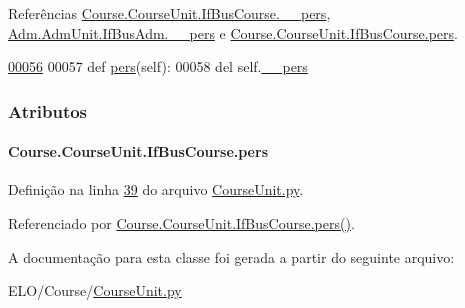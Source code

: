 Referências \hyperlink{CourseUnit_8py_source_l00051}{Course.\-Course\-Unit.\-If\-Bus\-Course.\-\_\-\-\_\-pers}, \hyperlink{AdmUnit_8py_source_l00112}{Adm.\-Adm\-Unit.\-If\-Bus\-Adm.\-\_\-\-\_\-pers} e \hyperlink{classCourse_1_1CourseUnit_1_1IfBusCourse_ab926ae8fb127b7697e2b63025df09a78}{Course.\-Course\-Unit.\-If\-Bus\-Course.\-pers}.


\begin{DoxyCode}
\hypertarget{classCourse_1_1CourseUnit_1_1IfBusCourse_l00056}{}\hyperlink{classCourse_1_1CourseUnit_1_1IfBusCourse_adf5702dec1a99bbb31936b7f1d425a40}{00056} 
00057     \textcolor{keyword}{def }\hyperlink{classCourse_1_1CourseUnit_1_1IfBusCourse_ab926ae8fb127b7697e2b63025df09a78}{pers}(self):
00058         del self.\hyperlink{classCourse_1_1CourseUnit_1_1IfBusCourse_a4d7664514162640c28bda49579b46ef0}{\_\_pers}

\end{DoxyCode}


\subsubsection{Atributos}
\hypertarget{classCourse_1_1CourseUnit_1_1IfBusCourse_ab926ae8fb127b7697e2b63025df09a78}{
\paragraph[{pers}]{\setlength{\rightskip}{0pt plus 5cm}Course.\-Course\-Unit.\-If\-Bus\-Course.\-pers}}\label{classCourse_1_1CourseUnit_1_1IfBusCourse_ab926ae8fb127b7697e2b63025df09a78}


Definição na linha \hyperlink{CourseUnit_8py_source_l00039}{39} do arquivo \hyperlink{CourseUnit_8py_source}{Course\-Unit.\-py}.



Referenciado por \hyperlink{classCourse_1_1CourseUnit_1_1IfBusCourse_adf5702dec1a99bbb31936b7f1d425a40}{Course.\-Course\-Unit.\-If\-Bus\-Course.\-pers()}.



A documentação para esta classe foi gerada a partir do seguinte arquivo\-:\begin{DoxyCompactItemize}
\item 
E\-L\-O/\-Course/\hyperlink{CourseUnit_8py}{Course\-Unit.\-py}\end{DoxyCompactItemize}
